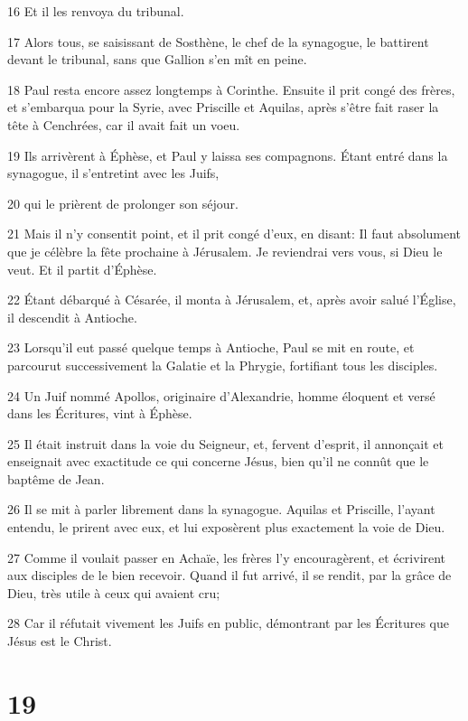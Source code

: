 \par 16 Et il les renvoya du tribunal.
\par 17 Alors tous, se saisissant de Sosthène, le chef de la synagogue, le battirent devant le tribunal, sans que Gallion s'en mît en peine.
\par 18 Paul resta encore assez longtemps à Corinthe. Ensuite il prit congé des frères, et s'embarqua pour la Syrie, avec Priscille et Aquilas, après s'être fait raser la tête à Cenchrées, car il avait fait un voeu.
\par 19 Ils arrivèrent à Éphèse, et Paul y laissa ses compagnons. Étant entré dans la synagogue, il s'entretint avec les Juifs,
\par 20 qui le prièrent de prolonger son séjour.
\par 21 Mais il n'y consentit point, et il prit congé d'eux, en disant: Il faut absolument que je célèbre la fête prochaine à Jérusalem. Je reviendrai vers vous, si Dieu le veut. Et il partit d'Éphèse.
\par 22 Étant débarqué à Césarée, il monta à Jérusalem, et, après avoir salué l'Église, il descendit à Antioche.
\par 23 Lorsqu'il eut passé quelque temps à Antioche, Paul se mit en route, et parcourut successivement la Galatie et la Phrygie, fortifiant tous les disciples.
\par 24 Un Juif nommé Apollos, originaire d'Alexandrie, homme éloquent et versé dans les Écritures, vint à Éphèse.
\par 25 Il était instruit dans la voie du Seigneur, et, fervent d'esprit, il annonçait et enseignait avec exactitude ce qui concerne Jésus, bien qu'il ne connût que le baptême de Jean.
\par 26 Il se mit à parler librement dans la synagogue. Aquilas et Priscille, l'ayant entendu, le prirent avec eux, et lui exposèrent plus exactement la voie de Dieu.
\par 27 Comme il voulait passer en Achaïe, les frères l'y encouragèrent, et écrivirent aux disciples de le bien recevoir. Quand il fut arrivé, il se rendit, par la grâce de Dieu, très utile à ceux qui avaient cru;
\par 28 Car il réfutait vivement les Juifs en public, démontrant par les Écritures que Jésus est le Christ.

\chapter{19}


